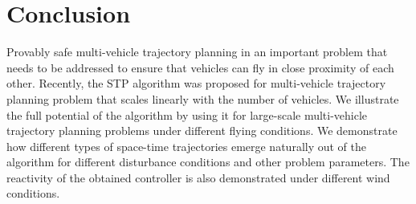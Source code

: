 \section{Conclusion}
Provably safe multi-vehicle trajectory planning in an important problem that needs to be addressed to ensure that vehicles can fly in close proximity of each other. Recently, the STP algorithm was proposed for multi-vehicle trajectory planning problem that scales linearly with the number of vehicles. We illustrate the full potential of the algorithm by using it for large-scale multi-vehicle trajectory planning problems under different flying conditions. We demonstrate how different types of space-time trajectories emerge naturally out of the algorithm for different disturbance conditions and other problem parameters. The reactivity of the obtained controller is also demonstrated under different wind conditions.